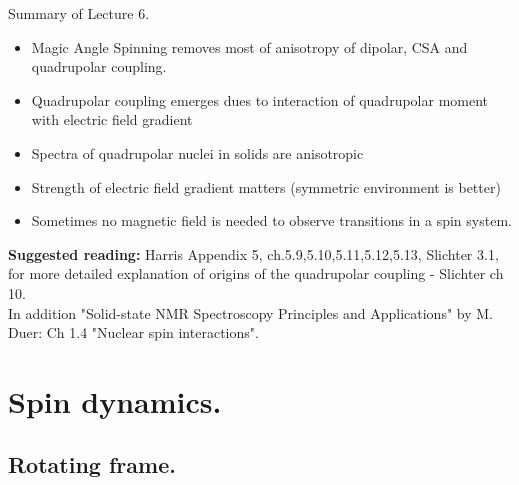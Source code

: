 \documentclass[handout]{beamer}
\begin{document}
\begin{frame}{Summary of Lecture 6.}
	\begin{itemize}[<+>]
		\item 	Magic Angle Spinning removes most of anisotropy of dipolar, CSA and quadrupolar coupling.
		\item Quadrupolar coupling emerges dues to interaction of quadrupolar moment with electric field gradient
		\item Spectra of quadrupolar nuclei in solids are anisotropic
		\item Strength of electric field gradient matters (symmetric environment is better)
		\item Sometimes no magnetic field is needed to observe transitions in a spin system.
	\end{itemize}
	
    \textbf{Suggested reading:}  Harris  Appendix 5, ch.5.9,5.10,5.11,5.12,5.13, Slichter 3.1, for more detailed explanation of origins of the quadrupolar coupling - Slichter ch 10.\\
    In addition "Solid-state NMR Spectroscopy Principles and Applications" by M. Duer: Ch 1.4 "Nuclear spin interactions".
    
\end{frame}


\section{Spin dynamics.}
\subsection{Rotating frame.}
\end{document}
